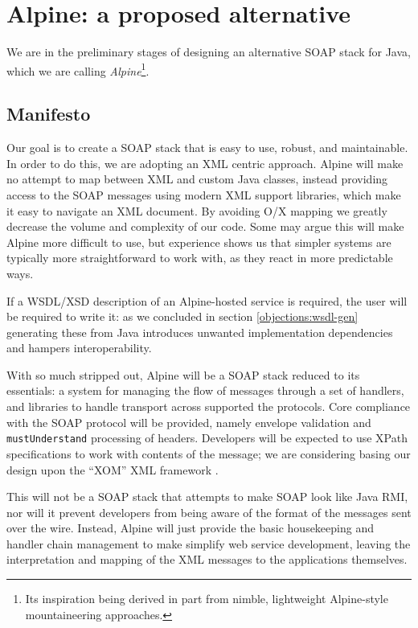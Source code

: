 \section{Alpine: a proposed alternative}
\label{alpine}

We are in the preliminary stages of designing an alternative SOAP
stack for Java, which we are calling \emph{Alpine}\footnote{Its inspiration
being derived in part from nimble, lightweight Alpine-style mountaineering
approaches.}. 

\subsection{Manifesto}
\label{alpine:manifesto}

Our goal is to create a SOAP stack that is easy to use, robust, and
maintainable. In order to do this, we are adopting an XML centric
approach. Alpine will make no attempt to map between XML and custom
Java classes, instead providing access to the SOAP messages using
modern XML support libraries, which make it easy to navigate an XML
document. By avoiding O/X mapping we greatly decrease the volume and
complexity of our code. Some may argue this will make Alpine more
difficult to use, but experience shows us that simpler systems are
typically more straightforward to work with, as they react in more
predictable ways.

If a WSDL/XSD description of an Alpine-hosted service is required, the
user will be required to write it: as we concluded in section
\ref{objections:wsdl-gen} generating these from Java introduces
unwanted implementation dependencies and hampers interoperability.

With so much stripped out, Alpine will be a SOAP stack reduced to its
essentials: a system for managing the flow of messages through a set
of handlers, and libraries to handle transport across supported the
protocols. Core compliance with the SOAP protocol will be provided,
namely envelope validation and \verb|mustUnderstand| processing of
headers. Developers will be expected to use XPath specifications to
work with contents of the message; we are considering basing our
design upon the ``XOM'' XML framework \cite{harold:xom}.

This will not be a SOAP stack that attempts to make SOAP look like
Java RMI, nor will it prevent developers from being aware of the
format of the messages sent over the wire. Instead, Alpine will just
provide the basic housekeeping and handler chain management to make
simplify web service development, leaving the interpretation and
mapping of the XML messages to the applications themselves.

